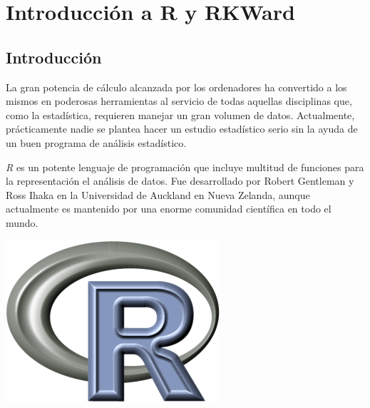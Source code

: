 \chapter{Introducción a R y RKWard}\label{cap:introduccion}

\section{Introducción}
La gran potencia de cálculo alcanzada por los ordenadores ha convertido a los mismos en poderosas herramientas al
servicio de todas aquellas disciplinas que, como la estadística, requieren manejar un gran volumen de datos.
Actualmente, prácticamente nadie se plantea hacer un estudio estadístico serio sin la ayuda de un buen programa de
análisis estadístico.

\emph{R} es un potente lenguaje de programación que incluye multitud de funciones para la representación el análisis de
datos.
Fue desarrollado por Robert Gentleman y Ross Ihaka en la Universidad de Auckland en Nueva Zelanda, aunque actualmente es
mantenido por una enorme comunidad científica en todo el mundo.

\begin{center}
\includegraphics[scale=0.5]{capitulos/introduccion/img/Rlogo}
\end{center} 

